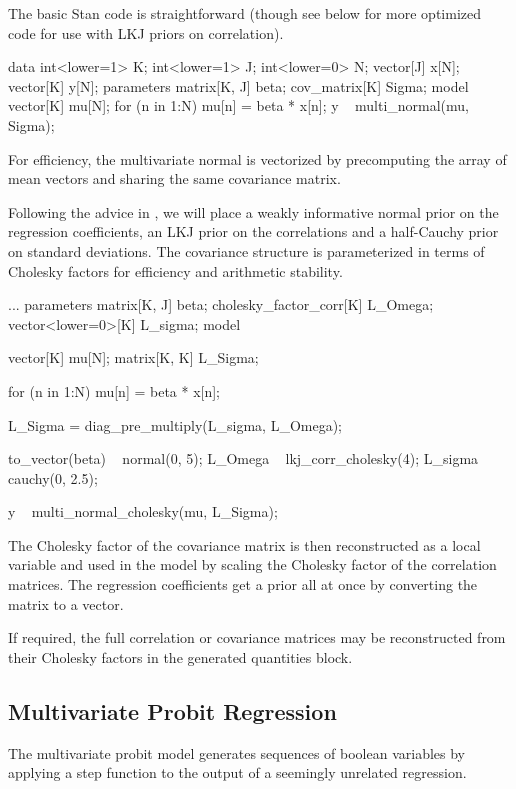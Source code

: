 The basic Stan code is straightforward (though see below for more
optimized code for use with LKJ priors on correlation).
%
\begin{stancode}
data {
  int<lower=1> K;
  int<lower=1> J;
  int<lower=0> N;
  vector[J] x[N];
  vector[K] y[N];
}
parameters {
  matrix[K, J] beta;
  cov_matrix[K] Sigma;
}
model {
  vector[K] mu[N];
  for (n in 1:N)
    mu[n] = beta * x[n];
  y ~ multi_normal(mu, Sigma);
}
\end{stancode}
%
For efficiency, the multivariate normal is vectorized by precomputing
the array of mean vectors and sharing the same covariance matrix.

Following the advice in ,
we will place a weakly informative normal prior on the regression
coefficients, an LKJ prior on the correlations and a half-Cauchy prior
on standard deviations.  The covariance structure is parameterized in
terms of Cholesky factors for efficiency and arithmetic stability.
%
\begin{stancode}
...
parameters {
  matrix[K, J] beta;
  cholesky_factor_corr[K] L_Omega;
  vector<lower=0>[K] L_sigma;
}
model {
  vector[K] mu[N];
  matrix[K, K] L_Sigma;

  for (n in 1:N)
    mu[n] = beta * x[n];

  L_Sigma = diag_pre_multiply(L_sigma, L_Omega);

  to_vector(beta) ~ normal(0, 5);
  L_Omega ~ lkj_corr_cholesky(4);
  L_sigma ~ cauchy(0, 2.5);

  y ~ multi_normal_cholesky(mu, L_Sigma);
}
\end{stancode}
%
The Cholesky factor of the covariance matrix is then reconstructed as
a local variable and used in the model by scaling the Cholesky factor
of the correlation matrices. The regression coefficients get a prior
all at once by converting the matrix  to a vector.

If required, the full correlation or covariance matrices may be
reconstructed from their Cholesky factors in the generated quantities
block.  


\subsection{Multivariate Probit Regression}

The multivariate probit model generates sequences of boolean variables
by applying a step function to the output of a seemingly unrelated
regression.

